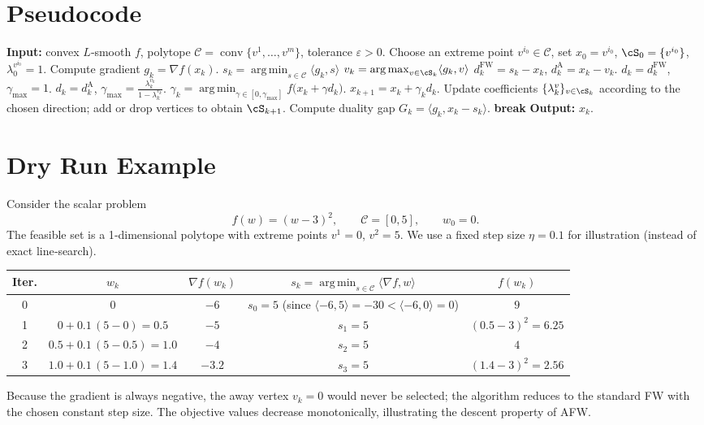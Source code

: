 \documentclass{article}
\newcommand{\cC}{\mathcal{C}}
\newcommand{\conv}{\operatorname{conv}}
\newcommand{\argmin}{\operatorname*{arg\,min}}
\newcommand{\argmax}{\operatorname*{arg\,max}}
\newcommand{\inner}[2]{\langle #1,#2\rangle}
\begin{document}
\section*{Pseudocode}
\begin{algorithm}[H]
\caption{Away‑Step Frank‑Wolfe (AFW)}
\begin{algorithmic}[1]
\State \textbf{Input:} convex $L$‑smooth $f$, polytope $\cC=\conv\{v^{1},\dots ,v^{m}\}$, tolerance $\varepsilon>0$.
\State Choose an extreme point $v^{i_{0}}\in\cC$, set $x_{0}=v^{i_{0}}$, $\cS_{0}=\{v^{i_{0}}\}$, $\lambda^{v^{i_{0}}}_{0}=1$.
    \State Compute gradient $g_{k}= \nabla f(x_{k})$.
    \State $s_{k}= \argmin_{s\in\cC}\inner{g_{k}}{s}$   
    \State $v_{k}= \argmax_{v\in \cS_{k}}\inner{g_{k}}{v}$ 
    \State $d_{k}^{\text{FW}}=s_{k}-x_{k}$,\; $d_{k}^{\text{A}}=x_{k}-v_{k}$.
    \If{$\inner{g_{k}}{d_{k}^{\text{FW}}}\le\inner{g_{k}}{d_{k}^{\text{A}}}$}
        \State $d_{k}=d_{k}^{\text{FW}}$, $\gamma_{\max}=1$.
    \Else
        \State $d_{k}=d_{k}^{\text{A}}$, $\displaystyle\gamma_{\max}= \frac{\lambda^{v_{k}}_{k}}{1-\lambda^{v_{k}}_{k}}$.
    \EndIf
    \State $\displaystyle\gamma_{k}= \argmin_{\gamma\in[0,\gamma_{\max}]} f\bigl(x_{k}+ \gamma d_{k}\bigr)$.
    \State $x_{k+1}=x_{k}+ \gamma_{k}d_{k}$.
    \State Update coefficients $\{\lambda^{v}_{k}\}_{v\in\cS_{k}}$ according to the chosen direction;
    add or drop vertices to obtain $\cS_{k+1}$.
    \State Compute duality gap $G_{k}= \inner{g_{k}}{x_{k}-s_{k}}$.
        \State \textbf{break}
    \EndIf
\EndFor
\State \textbf{Output:} $x_{k}$.
\end{algorithmic}
\end{algorithm}

\section*{Dry Run Example}
Consider the scalar problem
\[
f(w)= (w-3)^{2},\qquad \cC=[0,5],\qquad w_{0}=0.
\]
The feasible set is a 1‑dimensional polytope with extreme points $v^{1}=0$, $v^{2}=5$.
We use a fixed step size $\eta=0.1$ for illustration (instead of exact line‑search).

\begin{center}
\begin{tabular}{c|c|c|c|c}
\textbf{Iter.} & $w_{k}$ & $\nabla f(w_{k})$ & $s_{k}=\argmin_{s\in\cC}\langle\nabla f,w\rangle$ & $f(w_{k})$\\ \hline
0 & $0$ & $-6$ & $s_{0}=5$ (since $\langle-6,5\rangle=-30<\langle-6,0\rangle=0$) & $9$\\
1 & $0+0.1\,(5-0)=0.5$ & $-5$ & $s_{1}=5$ & $(0.5-3)^{2}=6.25$\\
2 & $0.5+0.1\,(5-0.5)=1.0$ & $-4$ & $s_{2}=5$ & $4$\\
3 & $1.0+0.1\,(5-1.0)=1.4$ & $-3.2$ & $s_{3}=5$ & $(1.4-3)^{2}=2.56$
\end{tabular}
\end{center}
Because the gradient is always negative, the away vertex $v_{k}=0$ would never be selected; the algorithm reduces to the standard FW with the chosen constant step size. The objective values decrease monotonically, illustrating the descent property of AFW.
\end{document}
